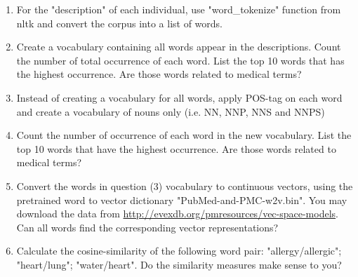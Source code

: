 \documentclass{article}
\begin{document}
\begin{enumerate}[(1)]
	\item For the "description" of each individual, use "word\_tokenize" function from nltk and convert the corpus into a list of words.
	\item Create a vocabulary containing all words appear in the descriptions. Count the number of total occurrence of each word. List the top 10 words that has the highest occurrence. Are those words related to medical terms?
	\item Instead of creating a vocabulary for all words, apply POS-tag on each word and create a vocabulary of nouns only (i.e. NN, NNP, NNS and NNPS)
	\item Count the number of occurrence of each word in the new vocabulary. List the top 10 words that have the highest occurrence. Are those words related to medical terms?
	\item Convert the words in question (3) vocabulary to continuous vectors, using the pretrained word to vector dictionary "PubMed-and-PMC-w2v.bin". You may download the data from \url{http://evexdb.org/pmresources/vec-space-models}. Can all words find the corresponding vector representations?
	\item Calculate the cosine-similarity of the following word pair: "allergy/allergic"; "heart/lung"; "water/heart". Do the similarity measures make sense to you?
\end{enumerate}
\end{document}

